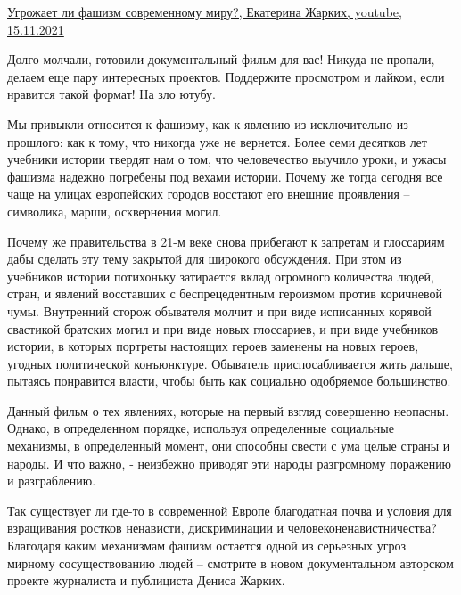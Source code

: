  
 
 
 
 

\href{https://youtu.be/dojoAovL-6M}{%
Угрожает ли фашизм современному миру?, Екатерина Жарких, youtube, 15.11.2021%
}

\begin{multicols}{2}
Долго молчали, готовили документальный фильм для вас! Никуда не пропали, делаем
еще пару интересных проектов. Поддержите просмотром и лайком, если нравится
такой формат! На зло ютубу.
  
Мы привыкли относится к фашизму, как к явлению из исключительно из прошлого:
как к тому, что никогда уже не вернется. Более семи десятков лет учебники
истории твердят нам о том, что человечество выучило уроки, и ужасы фашизма
надежно погребены под вехами истории. Почему же тогда сегодня все чаще на
улицах европейских городов восстают его внешние проявления – символика, марши,
осквернения могил. 

Почему же правительства в 21-м веке снова прибегают к запретам и глоссариям
дабы сделать эту тему закрытой для широкого обсуждения. При этом из учебников
истории потихоньку затирается вклад огромного количества людей, стран, и
явлений восставших с беспрецедентным героизмом против коричневой чумы.
Внутренний сторож обывателя молчит и при виде исписанных корявой свастикой
братских могил и при виде новых глоссариев, и при виде учебников истории, в
которых портреты настоящих героев заменены на новых героев, угодных
политической конъюнктуре. Обыватель приспосабливается жить дальше, пытаясь
понравится власти, чтобы быть как социально одобряемое большинство. 

Данный фильм о тех явлениях, которые на первый взгляд совершенно неопасны.
Однако, в определенном порядке, используя определенные социальные механизмы, в
определенный момент, они способны свести с ума целые страны и народы. И что
важно, - неизбежно приводят эти народы разгромному поражению и разграблению. 

Так существует ли где-то в современной Европе благодатная почва и условия для
взращивания ростков ненависти, дискриминации и человеконенавистничества?
Благодаря каким механизмам фашизм остается одной из серьезных угроз мирному
сосуществованию людей – смотрите в новом документальном авторском проекте
журналиста и публициста Дениса Жарких.
\end{multicols}

